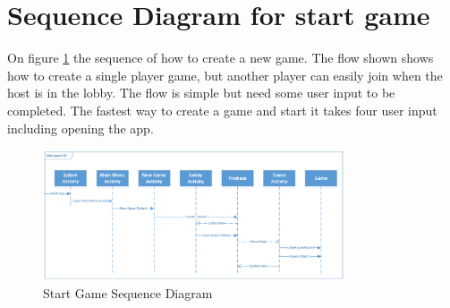 \section{Sequence Diagram for start game}

On figure \ref{SequenceDiagram} the sequence of how to create a new game. The flow shown shows how to create a single player game, but another player can easily join when the host is in the lobby. The flow is simple but need some user input to be completed. The fastest way to create a game and start it takes four user input including opening the app.

\begin{figure}
	\centering
	\includegraphics[width=0.8\textwidth]{images/Start_Game_Sequence_Diagram.png}
	\caption{Start Game Sequence Diagram \label{SequenceDiagram}}
\end{figure}
